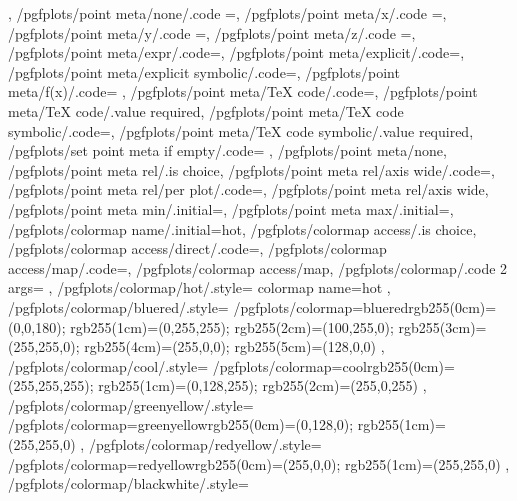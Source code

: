 {{		%
	},%
	/pgfplots/point meta/none/.code	={},%
	/pgfplots/point meta/x/.code	={},%
	/pgfplots/point meta/y/.code	={},%
	/pgfplots/point meta/z/.code	={},%
	/pgfplots/point meta/expr/.code={},%
	/pgfplots/point meta/explicit/.code={},%
	/pgfplots/point meta/explicit symbolic/.code={},%
	/pgfplots/point meta/f(x)/.code={
		\ifpgfplots@curplot@threedim
		\else
		\fi
	},
	/pgfplots/point meta/TeX code/.code={},%
	/pgfplots/point meta/TeX code/.value required,
	/pgfplots/point meta/TeX code symbolic/.code={},%
	/pgfplots/point meta/TeX code symbolic/.value required,
	/pgfplots/set point meta if empty/.code={%
		\ifx\pgfplotspointmetainputhandler\pgfutil@empty
		\fi
	},%
	/pgfplots/point meta/none,
	/pgfplots/point meta rel/.is choice,
	/pgfplots/point meta rel/axis wide/.code={\def\pgfplots@perpointmeta@rel@choice{0}},%
	/pgfplots/point meta rel/per plot/.code={\def\pgfplots@perpointmeta@rel@choice{1}},%
	/pgfplots/point meta rel/axis wide,%
	/pgfplots/point meta min/.initial=,%
	/pgfplots/point meta max/.initial=,%
	/pgfplots/colormap name/.initial=hot,
	/pgfplots/colormap access/.is choice,
	/pgfplots/colormap access/direct/.code={\def\pgfplots@colormap@access{d}},%
	/pgfplots/colormap access/map/.code={\def\pgfplots@colormap@access{m}},%
	/pgfplots/colormap access/map,%
	/pgfplots/colormap/.code 2 args={%
	},
	/pgfplots/colormap/hot/.style={
		colormap name=hot
	},
	/pgfplots/colormap/bluered/.style={
		/pgfplots/colormap={bluered}{rgb255(0cm)=(0,0,180); rgb255(1cm)=(0,255,255); rgb255(2cm)=(100,255,0); rgb255(3cm)=(255,255,0); rgb255(4cm)=(255,0,0); rgb255(5cm)=(128,0,0)}
	},
	/pgfplots/colormap/cool/.style={
		/pgfplots/colormap={cool}{rgb255(0cm)=(255,255,255); rgb255(1cm)=(0,128,255); rgb255(2cm)=(255,0,255)}
	},
	/pgfplots/colormap/greenyellow/.style={
		/pgfplots/colormap={greenyellow}{rgb255(0cm)=(0,128,0); rgb255(1cm)=(255,255,0)}
	},
	/pgfplots/colormap/redyellow/.style={
		/pgfplots/colormap={redyellow}{rgb255(0cm)=(255,0,0); rgb255(1cm)=(255,255,0)}
	},
	/pgfplots/colormap/blackwhite/.style={
}}
